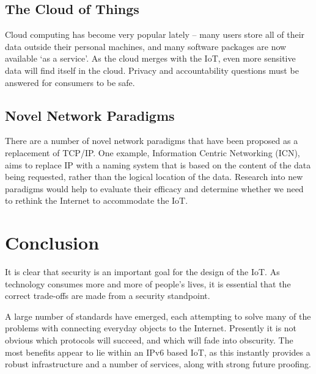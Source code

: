 \documentclass[10pt,journal,compsoc]{IEEEtran}
\begin{document}
\subsection{The Cloud of Things}
Cloud computing has become very popular lately -- many users store all of their
data outside their personal machines, and many software packages are now
available `as a service'. As the cloud merges with the IoT, even more sensitive
data will find itself in the cloud. Privacy and accountability questions must
be answered for consumers to be safe.

\subsection{Novel Network Paradigms}
There are a number of novel network paradigms that have been proposed as a
replacement of TCP/IP. One example, Information Centric Networking (ICN), aims
to replace IP with a naming system that is based on the content of the data
being requested, rather than the logical location of the data. Research into
new paradigms would help to evaluate their efficacy and determine whether we
need to rethink the Internet to accommodate the IoT. 


\section{Conclusion}
It is clear that security is an important goal for the design of the IoT. As
technology consumes more and more of people's lives, it is essential that the
correct trade-offs are made from a security standpoint. 

A large number of standards have emerged, each attempting to solve many of the
problems with connecting everyday objects to the Internet. Presently it is not
obvious which protocols will succeed, and which will fade into obscurity. The
most benefits appear to lie within an IPv6 based IoT, as this instantly
provides a robust infrastructure and a number of services, along with strong
future proofing.  



%
%
%

{}

\end{document}

